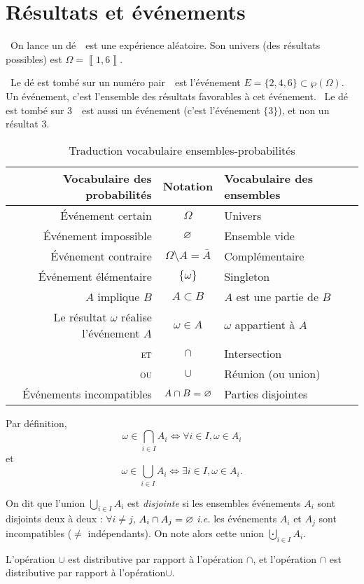 \section{Résultats et événements}

\begin{exm}
	\guillemotleft~On lance un dé~\guillemotright\ est une expérience aléatoire. Son univers (des résultats possibles) est $\Omega = \left\llbracket 1,6 \right\rrbracket$.

	\guillemotleft~Le dé est tombé sur un numéro pair~\guillemotright\ est l'événement $E = \{2,4,6\} \subset \wp(\Omega)$. Un événement, c'est l'ensemble des résultats favorables à cet événement.
	\guillemotleft~Le dé est tombé sur 3~\guillemotright\ est aussi un événement (c'est l'événement $\{3\}$), et non un résultat 3.
\end{exm}

\begin{table}[H]
	\centering
	\begin{tabular}{r|c|l}
		Vocabulaire des probabilités & Notation & Vocabulaire des ensembles \\ \hline
		Événement certain & $\Omega$\/ & Univers \\
		Événement impossible & $\varnothing$\/ & Ensemble vide\\
		Événement contraire & $\Omega \setminus A = \bar{A}$\/ & Complémentaire \\
		Événement élémentaire & $\{\omega\}$\/ & Singleton\\
		$A$\/ implique $B$\/ & $A \subset B$\/ & $A$\/ est une partie de $B$\/ \\
		Le résultat $\omega$\/ réalise l'événement $A$\/ & $\omega \in A$\/ & $\omega$\/ appartient à $A$\/ \\
		\textsc{et} & $\cap$\/ & Intersection\\
		\textsc{ou} & $\cup $\/ & Réunion (ou union)\\
		Événements incompatibles & $A \cap B = \varnothing$\/ & Parties disjointes
	\end{tabular}
	\caption{Traduction vocabulaire ensembles-probabilités}
\end{table}

\begin{rmk}
	Par définition, \[
		\omega \in \bigcap_{i \in I} A_i \iff \forall i \in I, \omega \in A_i
	\] et \[
		\omega \in \bigcup_{i \in  I} A_i \iff \exists i \in I,\omega \in A_i
	.\]

	On dit que l'union $\bigcup_{i \in  I} A_i$\/ est \textit{disjointe} si les ensembles événements $A_i$\/ sont disjoints deux à deux : $\forall i \neq j$, $A_i \cap A_j = \varnothing$ \textsl{i.e.} les événements $A_i$\/ et $A_j$\/ sont incompatibles ($\neq$ indépendants). On note alors cette union $\bigcupdot_{i \in  I} A_i$.

	L'opération $\cup$\/ est distributive par rapport à l'opération $\cap$, et l'opération $\cap$\/ est distributive par rapport à l'opération$\cup$.
\end{rmk}

